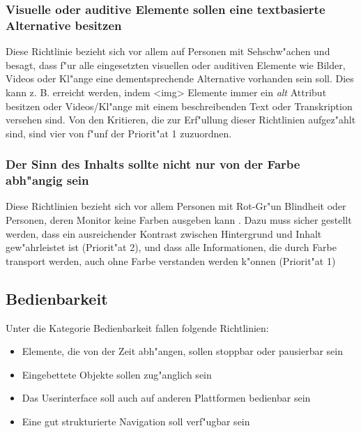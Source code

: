 \documentclass[a4paper,bibtotoc,oneside]{scrbook}
\begin{document}
\subsubsection{Visuelle oder auditive Elemente sollen eine textbasierte Alternative besitzen}
Diese Richtlinie bezieht sich vor allem auf Personen mit Sehschw"achen und besagt, dass f"ur alle eingesetzten visuellen oder auditiven Elemente wie Bilder, Videos oder Kl"ange eine dementsprechende Alternative vorhanden sein soll. Dies kann z. B. erreicht werden, indem <img> Elemente immer ein \emph{alt} Attribut besitzen oder Videos/Kl"ange mit einem beschreibenden Text oder Transkription versehen sind. Von den Kritieren, die  zur Erf"ullung dieser Richtlinien aufgez"ahlt sind, sind vier von f"unf der Priorit"at 1 zuzuordnen. \cite[Abschnitt 6.1]{wcag1}

\subsubsection{Der Sinn des Inhalts sollte nicht nur von der Farbe abh"angig sein}
Diese Richtlinien bezieht sich vor allem Personen mit Rot-Gr"un Blindheit oder Personen, deren Monitor keine Farben ausgeben kann \cite[S. 41]{barr_webd}. Dazu muss sicher gestellt werden, dass ein ausreichender Kontrast zwischen Hintergrund und Inhalt gew"ahrleistet ist (Priorit"at 2), und dass alle Informationen, die durch Farbe transport werden, auch ohne Farbe verstanden werden k"onnen (Priorit"at 1) \cite[Abschnitt 6.1]{wcag1}


\subsection{Bedienbarkeit}
Unter die Kategorie Bedienbarkeit fallen folgende Richtlinien: 

\begin{itemize}
\item Elemente, die von der Zeit abh"angen, sollen stoppbar oder pausierbar sein \cite[Abschnitt 6.7]{wcag1}
\item Eingebettete Objekte sollen zug"anglich sein\cite[Abschnitt 6.8]{wcag1}
\item Das Userinterface soll auch auf anderen Plattformen bedienbar sein\cite[Abschnitt 6.9]{wcag1}
\item Eine gut strukturierte Navigation soll verf"ugbar sein\cite[Abschnitt 6.13]{wcag1}
\end{itemize}
\end{document}
